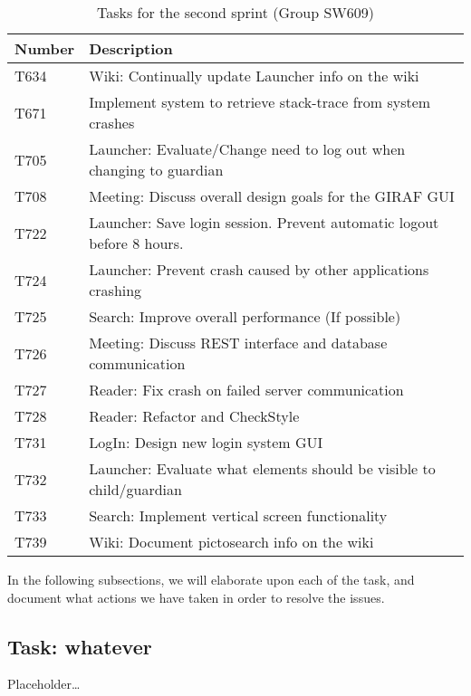 \begin{table}[H]
\centering
\begin{tabular}{|l|l|}
\hline
Number	& Description												\\\hline
T634  	& Wiki: Continually update Launcher info on the wiki\\\hline 
T671    & Implement system to retrieve stack-trace from system crashes\\\hline 
T705	& Launcher: Evaluate/Change need to log out when changing  to guardian\\\hline 
T708    & Meeting: Discuss overall design goals for the GIRAF GUI \\\hline
T722   	& Launcher: Save login session. Prevent automatic logout before 8 hours. \\\hline 
T724   	& Launcher: Prevent crash caused by other applications crashing\\\hline
T725  	& Search: Improve overall performance (If possible)			   							\\\hline
T726    & Meeting: Discuss REST interface and database communication \\\hline
T727    & Reader: Fix crash on failed server communication  				\\\hline 
T728	& Reader: Refactor and CheckStyle \\\hline
T731    & LogIn: Design new login system GUI               			\\\hline
T732    & Launcher: Evaluate what elements should be visible to child/guardian\\\hline 
T733    & Search: Implement vertical screen functionality    			\\\hline 
T739    & Wiki: Document pictosearch info on the wiki	\\\hline
\end{tabular}
\caption{Tasks for the second sprint (Group SW609)} 
\label{SprintTwoTasks}    
\end{table} 

In the following subsections, we will elaborate upon each of the task, and
document what actions we have taken in order to resolve the issues.

\subsection{Task: whatever}
Placeholder\ldots
